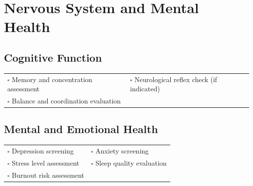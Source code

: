 
\section{Nervous System and Mental Health}
\label{sec:nervous}

\subsection{Cognitive Function}

\begin{tabular}{p{9cm} p{8cm}}
$\square$ Memory and concentration assessment & $\square$ Neurological reflex check (if indicated) \\ 
$\square$ Balance and coordination evaluation & \\ 
\end{tabular}

\subsection{Mental and Emotional Health}

\begin{tabular}{p{9cm} p{8cm}}
$\square$ Depression screening & $\square$ Anxiety screening \\ 
$\square$ Stress level assessment & $\square$ Sleep quality evaluation \\  
$\square$ Burnout risk assessment & \\  
\end{tabular}

